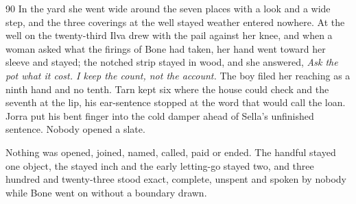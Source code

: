\begin{CRchronicle}{90}
In the yard she went wide around the seven places with a look and a wide step, and the three coverings at the well stayed weather entered nowhere. At the well on the twenty-third Ilva drew with the pail against her knee, and when a woman asked what the firings of Bone had taken, her hand went toward her sleeve and stayed; the notched strip stayed in wood, and she answered, \emph{Ask the pot what it cost. I keep the count, not the account.} The boy filed her reaching as a ninth hand and no tenth. Tarn kept six where the house could check and the seventh at the lip, his ear-sentence stopped at the word that would call the loan. Jorra put his bent finger into the cold damper ahead of Sella’s unfinished sentence. Nobody opened a slate.

Nothing was opened, joined, named, called, paid or ended. The handful stayed one object, the stayed inch and the early letting-go stayed two, and three hundred and twenty-three stood exact, complete, unspent and spoken by nobody while Bone went on without a boundary drawn.
\end{CRchronicle}
